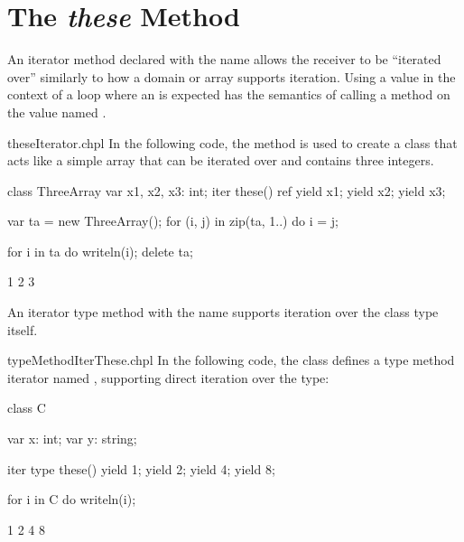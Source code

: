 \section{The {\em these} Method}
\label{The_these_Method}

An iterator method declared with the name  allows the
receiver to be
``iterated over'' similarly to how a domain or array supports iteration.
Using a value in the context of a loop where
an  is expected has the semantics of calling
a method on the value named .

\begin{chapelexample}{theseIterator.chpl}
In the following code, the  method is used to create a
class that acts like a simple array that can be iterated over and
contains three integers.
\begin{chapel}
class ThreeArray {
  var x1, x2, x3: int;
  iter these() ref {
    yield x1;
    yield x2;
    yield x3;
  }
}
\end{chapel}
\begin{chapelpost}
var ta = new ThreeArray();
for (i, j) in zip(ta, 1..) do
  i = j;

for i in ta do
  writeln(i);
delete ta;
\end{chapelpost}
\begin{chapeloutput}
1
2
3
\end{chapeloutput}

\end{chapelexample}

An iterator type method with the name  supports iteration
over the class type itself.

\begin{chapelexample}{typeMethodIterThese.chpl}
In the following code, the class  defines a type method
iterator named , supporting direct iteration over the type:
\begin{chapel}
class C {
  var x: int;
  var y: string;

  iter type these() {
    yield 1;
    yield 2;
    yield 4;
    yield 8;
  }
}

for i in C do
  writeln(i);
\end{chapel}
\begin{chapeloutput}
1
2
4
8
\end{chapeloutput}
\end{chapelexample}
